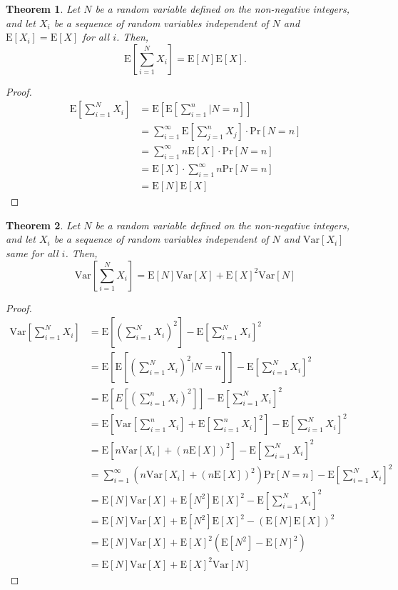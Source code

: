 \documentclass{article}
\newtheorem{theorem}{Theorem}
\newcommand{\E}{\mathrm{E}}
\newcommand{\Var}{\mathrm{Var}}
\begin{document}
\begin{theorem}
Let $N$ be a random variable defined on the non-negative integers, and let $X_i$ be a sequence of random variables independent of $N$ and $\mathrm{E}[X_i]=\mathrm{E}[X]$ for all $i$. Then,$$\mathrm{E}\left[\sum_{i=1}^NX_i\right]=\mathrm{E}[N]\mathrm{E}[X].$$
\end{theorem}

\begin{proof}
\begin{align*}
\mathrm{E}\left[\sum_{i=1}^NX_i\right]&=\mathrm{E}\left[\mathrm{E}\left[\sum_{i=1}^n|N=n\right]\right]\\
&=\sum_{i=1}^\infty \mathrm{E}\left[\sum_{j=1}^n X_j\right] \cdot \mathrm{Pr}[N=n]\\
&=\sum_{i=1}^\infty n\mathrm{E}[X]\cdot \mathrm{Pr}[N=n]\\
&=\mathrm{E}[X]\cdot \sum_{i=1}^\infty n\mathrm{Pr}[N=n]\\
&=\mathrm{E}[N]\mathrm{E}[X]
\end{align*}
\end{proof}

\begin{theorem}
Let $N$ be a random variable defined on the non-negative integers, and let $X_i$ be a sequence of random variables independent of $N$ and $\mathrm{Var}[X_i]$ same for all $i$. Then,$$\mathrm{Var}\left[\sum_{i=1}^NX_i\right]=\mathrm{E}[N]\mathrm{Var}[X]+\mathrm{E}[X]^2 \mathrm{Var}[N]$$
\end{theorem}

\begin{proof}
\begin{align*}
\mathrm{Var}\left[\sum_{i=1}^NX_i\right]&=\E\left[\left(\sum_{i=1}^NX_i\right)^2\right]-\E\left[\sum_{i=1}^NX_i\right]^2\\
&=\E\left[\E\left[\left(\sum_{i=1}^NX_i\right)^2|N=n\right]\right]-\E\left[\sum_{i=1}^NX_i\right]^2\\
&=\E\left[E\left[\left(\sum_{i=1}^nX_i\right)^2\right]\right]-\E\left[\sum_{i=1}^NX_i\right]^2\\
&=\E\left[\Var\left[\sum_{i=1}^nX_i\right]+\E\left[\sum_{i=1}^nX_i\right]^2\right]-\E\left[\sum_{i=1}^NX_i\right]^2\\
&=\E\left[n\Var[X_i]+(n\E[X])^2\right]-\E\left[\sum_{i=1}^NX_i\right]^2\\
&=\sum_{i=1}^\infty (n\Var[X_i]+(n\E[X])^2)\mathrm{Pr}[N=n]-\E\left[\sum_{i=1}^NX_i\right]^2\\
&=\E[N]\Var[X]+\E[N^2]\E[X]^2-\E\left[\sum_{i=1}^NX_i\right]^2\\
&=\E[N]\Var[X]+\E[N^2]\E[X]^2-(\E[N]\E[X])^2\\
&=\E[N]\Var[X]+\E[X]^2(\E[N^2]-\E[N]^2)\\
&=\E[N]\Var[X]+\E[X]^2\Var[N]
\end{align*}
\end{proof}
\end{document}
